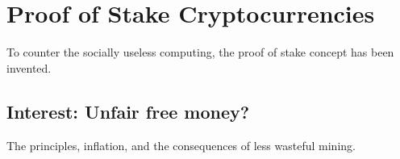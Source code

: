 
\chapter{Proof of Stake Cryptocurrencies}

To counter the socially useless computing, the proof of stake concept
has been invented.


\section{Interest: Unfair free money?}

The principles, inflation, and the consequences of less wasteful mining.
